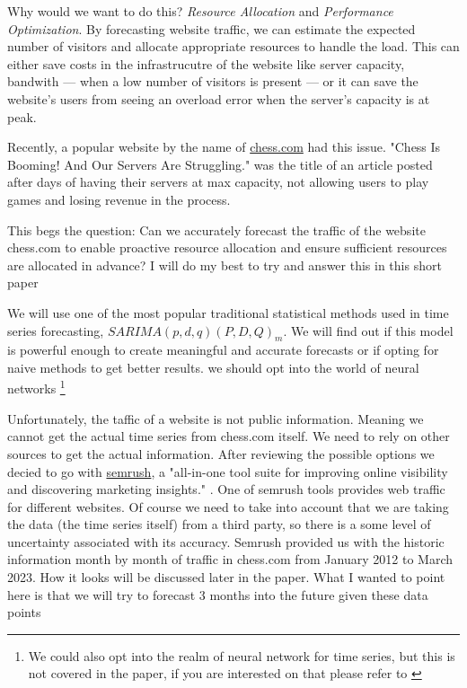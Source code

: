 \documentclass[journal]{IEEEtran}
\begin{document}
Why would we want to do this? \emph{Resource Allocation} and \emph{Performance
Optimization}. By forecasting website traffic, we can estimate the expected
number of visitors and allocate appropriate resources to handle the load. This
can either save costs in the infrastrucutre of the website like server
capacity, bandwith --- when a low number of visitors is present --- or it can
save the website's users from seeing an overload error when the server's
capacity is at peak.

Recently, a popular website by the name of \href{https://chess.com}{chess.com}
had this issue.  "Chess Is Booming! And Our Servers Are Struggling."
\cite{chesscom} was the title of an article posted after days of having their
servers at max capacity, not allowing users to play games and losing revenue in
the process.

This begs the question: Can we accurately forecast the traffic of the website
chess.com to enable proactive resource allocation and ensure sufficient
resources are allocated in advance? I will do my best to try and answer this in
this short paper

We will use one of the most popular traditional statistical methods used in
time series forecasting, $SARIMA(p,d,q)(P,D,Q)_m$. We will find out if this
model is powerful enough to create meaningful and accurate forecasts or if
opting for naive methods to get better results.  we should opt into the world
of neural networks \footnote{We could also opt into the realm of neural network
for time series, but this is not covered in the paper, if you are interested
on that please refer to \cite{nn}}

Unfortunately, the taffic of a website is not public information. Meaning we
cannot get the actual time series from chess.com itself. We need to rely on
other sources to get the actual information. After reviewing the possible
options we decied to go with  \href{http://semrush.com}{semrush}, a "all-in-one
tool suite for improving online visibility and discovering marketing insights."
\cite{semrush}. One of semrush tools provides web traffic for different
websites. Of course we need to take into account that we are taking the data
(the time series itself) from a third party, so there is a some level of
uncertainty associated with its accuracy. Semrush provided us with the historic
information month by month of traffic in chess.com from January 2012 to March
2023. How it looks will be discussed later in the paper. What I wanted to point
here is that we will try to forecast 3 months into the future given these data
points
\end{document}

